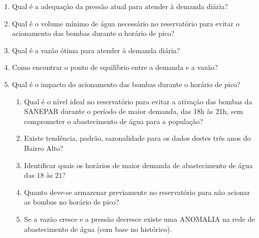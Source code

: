 \begin{enumerate}[start=1, label={\textbf{Q} \arabic*}]
	\item \label{q1} Qual é a adequação da pressão atual para atender à demanda diária?
	\item \label{q2} Qual é o volume mínimo de água necessário no reservatório para evitar o acionamento das bombas durante o horário de pico? 
	\item \label{q3} Qual é a vazão ótima para atender à demanda diária?
	\item \label{q4} Como encontrar o ponto de equilíbrio entre a demanda e a vazão?
	\item \label{q5} Qual é o impacto do acionamento das bombas durante o horário de pico?
	 
	\begin{enumerate}[label=\alph*]
	\item \label{q5:a} Qual é o nível ideal no reservatório para evitar a ativação das bombas da SANEPAR durante o período de maior demanda, das 18h às 21h, sem comprometer o abastecimento de água para a população?  
	\item \label{q5:b} Existe tendência, padrão, sazonalidade para os dados destes três anos do Bairro Alto?
	\item \label{q5:c} Identificar quais os horários de maior demanda de abastecimento de água das $18$ às $21$?
	\item \label{q5:d} Quanto deve-se armazenar previamente no reservatório para não acionar as bombas no horário de pico?
	\item \label{q5:e} Se a vazão cresce e a pressão decresce existe uma ANOMALIA na rede de abastecimento de água (com base no histórico).	
	\end{enumerate}
\end{enumerate}
